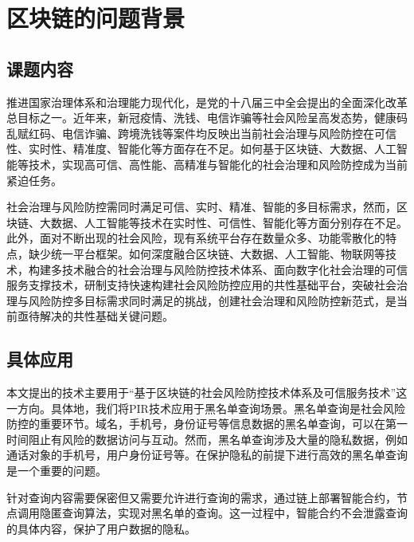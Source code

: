 \section{区块链的问题背景}

\subsection{课题内容}
推进国家治理体系和治理能力现代化，是党的十八届三中全会提出的全面深化改革总目标之一。近年来，新冠疫情、洗钱、电信诈骗等社会风险呈高发态势，健康码乱赋红码、电信诈骗、跨境洗钱等案件均反映出当前社会治理与风险防控在可信性、实时性、精准度、智能化等方面存在不足。如何基于区块链、大数据、人工智能等技术，实现高可信、高性能、高精准与智能化的社会治理和风险防控成为当前紧迫任务。

社会治理与风险防控需同时满足可信、实时、精准、智能的多目标需求，然而，区块链、大数据、人工智能等技术在实时性、可信性、智能化等方面分别存在不足。此外，面对不断出现的社会风险，现有系统平台存在数量众多、功能零散化的特点，缺少统一平台框架。如何深度融合区块链、大数据、人工智能、物联网等技术，构建多技术融合的社会治理与风险防控技术体系、面向数字化社会治理的可信服务支撑技术，研制支持快速构建社会风险防控应用的共性基础平台，突破社会治理与风险防控多目标需求同时满足的挑战，创建社会治理和风险防控新范式，是当前亟待解决的共性基础关键问题。

\subsection{具体应用}
本文提出的技术主要用于“基于区块链的社会风险防控技术体系及可信服务技术”这一方向。具体地，我们将PIR技术应用于黑名单查询场景。黑名单查询是社会风险防控的重要环节。域名，手机号，身份证号等信息数据的黑名单查询，可以在第一时间阻止有风险的数据访问与互动。然而，黑名单查询涉及大量的隐私数据，例如通话对象的手机号，用户身份证号等。在保护隐私的前提下进行高效的黑名单查询是一个重要的问题。

针对查询内容需要保密但又需要允许进行查询的需求，通过链上部署智能合约，节点调用隐匿查询算法，实现对黑名单的查询。这一过程中，智能合约不会泄露查询的具体内容，保护了用户数据的隐私。
